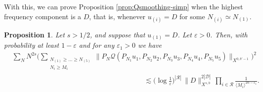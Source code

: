 \documentclass[11pt, xcolor = dvipsnames,reqno
]{amsart}
\newtheorem{prop}[thm]{Proposition}
\theoremstyle{definition}
\theoremstyle{remark}
\begin{document}
With this, we can prove Proposition \ref{prop:Qsmoothing-simp} when the highest frequency component is a $D$, that is, whenever $u_{(i)} = D$ for some $N_{(i)} \simeq N_{(1)}$. 

\begin{prop}\label{prop:Qsmoothing-mest}
Let $s > 1/2$, and suppose that $u_{(1)} = D$. Let $\varepsilon > 0$. Then, with probability at least $1-\varepsilon$ and for any $\varepsilon_1 >0$ we have
    \begin{align}\label{eq:Qsmoothing-mest}
    &\sum_N N^{2s} \bigg( \sum_{\substack{N_{(1)}\geq \ldots\geq N_{(5)} \\ N_i \geq M_i}}  \|P_N \mathcal{Q}(P_{N_1} u_1 , P_{N_2} u_{2} , P_{N_3} u_{3} , P_{N_4} u_{4} , P_{N_5} u_{5})\|_{X^{0,b'-1}} \bigg)^2 \nonumber \\
    & \hspace{8cm} \lesssim \Big(  \log \frac{1}{\varepsilon} \Big)^{|\mathcal{R}|} \, \|D\|_{X^{s,b}}^{2 |\mathcal{D}|} \,\prod_{i \in \mathcal{R}} \frac{1}{ \langle M_i \rangle^{2\alpha - \varepsilon_1}}.
    \end{align}
\end{prop}
\end{document}

